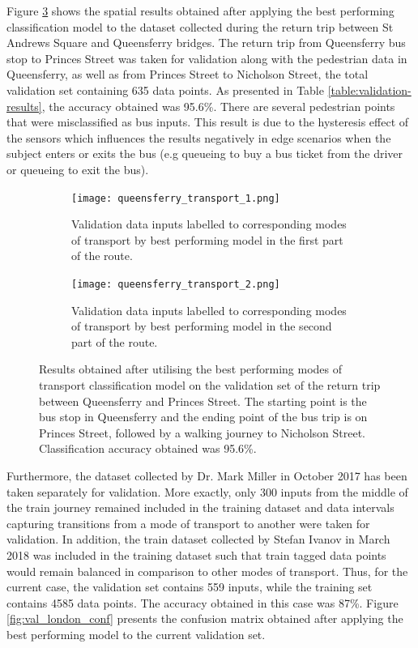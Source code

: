 \documentclass[bsc,frontabs,twoside,singlespacing, parskip,deptreport]{infthesis}     %
\begin{document}
Figure \ref{fig:queensferry-return-transport} shows the spatial results obtained after applying the best performing classification model to the dataset collected during the return trip between St Andrews Square and Queensferry bridges. The return trip from Queensferry bus stop to Princes Street was taken for validation along with the pedestrian data in Queensferry, as well as from Princes Street to Nicholson Street, the total validation set containing 635 data points. As presented in Table \ref{table:validation-results}, the accuracy obtained was 95.6\%. There are several pedestrian points that were misclassified as bus inputs. This result is due to the hysteresis effect of the sensors which influences the results negatively in edge scenarios when the subject enters or exits the bus (e.g queueing to buy a bus ticket from the driver or queueing to exit the bus).

\begin{figure}[h!]
  \begin{subfigure}[t]{\textwidth}
    \texttt{[image: queensferry\_transport\_1.png]}
    \caption{Validation data inputs labelled to corresponding modes of transport by best performing model in the first part of the route.}
    \label{fig:queensferry-return-transport-1}
  \end{subfigure}
  \hfill
  \begin{subfigure}[t]{\textwidth}
    \texttt{[image: queensferry\_transport\_2.png]}
    \caption{Validation data inputs labelled to corresponding modes of transport by best performing model in the second part of the route.}
    \label{fig:queensferry-return-transport-2}
  \end{subfigure}
  \caption{Results obtained after utilising the best performing modes of transport classification model on the validation set of the return trip between Queensferry and Princes Street. The starting point is the bus stop in Queensferry and the ending point of the bus trip is on Princes Street, followed by a walking journey to Nicholson Street. Classification accuracy obtained was 95.6\%.}
  \label{fig:queensferry-return-transport}
\end{figure}

Furthermore, the dataset collected by Dr. Mark Miller in October 2017 has been taken separately for validation. More exactly, only 300 inputs from the middle of the train journey remained included in the training dataset and data intervals capturing transitions from a mode of transport to another were taken for validation. In addition, the train dataset collected by Stefan Ivanov in March 2018 was included in the training dataset such that train tagged data points would remain balanced in comparison to other modes of transport. Thus, for the current case, the validation set contains 559 inputs, while the training set contains 4585 data points. The accuracy obtained in this case was 87\%. Figure \ref{fig:val_london_conf} presents the confusion matrix obtained after applying the best performing model to the current validation set.
\end{document}
